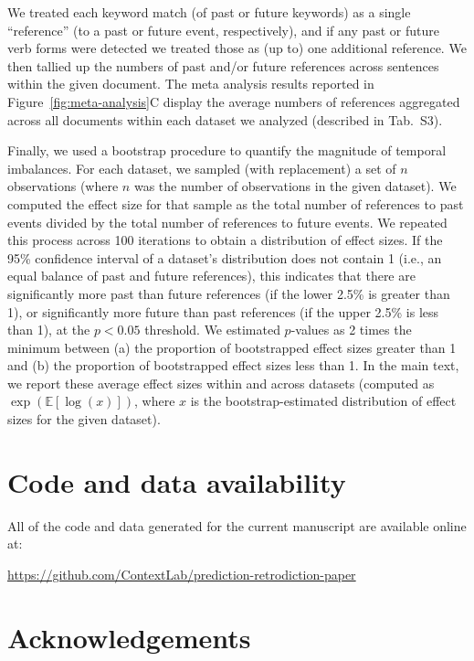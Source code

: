 \documentclass[10pt]{article}
\newcommand{\metaAnalysisDatasets}{S3}
\begin{document}
We treated each keyword match (of past or future keywords) as a single ``reference'' (to a past or future event, respectively), and if any past or future verb forms were detected we treated those as (up to) one additional reference. We then tallied up the numbers of past and/or future references across sentences within the given document. The meta analysis results reported in Figure~\ref{fig:meta-analysis}C display the average numbers of references aggregated across all documents within each dataset we analyzed (described in Tab.~\metaAnalysisDatasets).

Finally, we used a bootstrap procedure to quantify the magnitude of temporal imbalances.  For each dataset, we sampled (with replacement) a set of $n$ observations (where $n$ was the number of observations in the given dataset).  We computed the effect size for that sample as the total number of references to past events divided by the total number of references to future events.  We repeated this process across 100 iterations to obtain a distribution of effect sizes.  If the 95\% confidence interval of a dataset's distribution does not contain 1 (i.e., an equal balance of past and future references), this indicates that there are significantly more past than future references (if the lower 2.5\% is greater than 1), or significantly more future than past references (if the upper 2.5\% is less than 1), at the $p < 0.05$ threshold.  We estimated $p$-values as 2 times the minimum between (a) the proportion of bootstrapped effect sizes greater than 1 and (b) the proportion of bootstrapped effect sizes less than 1.  In the main text, we report these average effect sizes within and across datasets (computed as $\exp\left(\mathbb{E}\left[\log\left( x\right)\right]\right)$, where $x$ is the bootstrap-estimated distribution of effect sizes for the given dataset).

\section*{Code and data availability}

All of the code and data generated for the current manuscript are available online at:

\url{https://github.com/ContextLab/prediction-retrodiction-paper}

% 


\section*{Acknowledgements}
\end{document}
